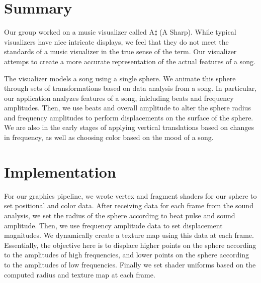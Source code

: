 \documentclass{article}
\begin{document}
\section{Summary}

Our group worked on a music visualizer called A$\sharp$ (A Sharp). While typical visualizers have nice intricate displays, we feel that they do not meet the standards of a music visualizer in the true sense of the term. Our visualizer attemps to create a more accurate representation of the actual features of a song.

The visualizer models a song using a single sphere. We animate this sphere through sets of transformations based on data analysis from a song. In particular, our application analyzes features of a song, inlcluding beats and frequency amplitudes. Then, we use beats and overall amplitude to alter the sphere radius and frequency amplitudes to perform displacements on the surface of the sphere. We are also in the early stages of applying vertical translations based on changes in frequency, as well as choosing color based on the mood of a song.


\section{Implementation}

For our graphics pipeline, we wrote vertex and fragment shaders for our sphere to set positional and color data. After receiving data for each frame from the sound analysis, we set the radius of the sphere according to beat pulse and sound amplitude. Then, we use frequency amplitude data to set displacement magnitudes. We dynamically create a texture map using this data at each frame. Essentially, the objective here is to displace higher points on the sphere according to the amplitudes of high frequencies, and lower points on the sphere according to the amplitudes of low frequencies. Finally we set shader uniforms based on the computed radius and texture map at each frame.
\end{document}
